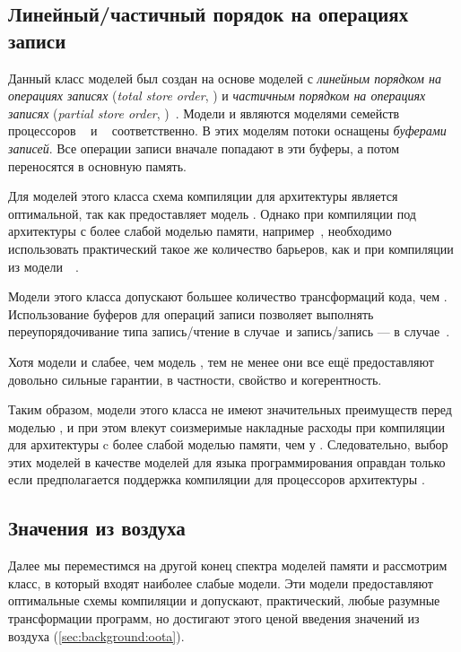 \subsection{Линейный/частичный порядок на операциях записи}
\label{sec:analysis:tso}

Данный  класс моделей был создан на основе моделей с 
\emph{линейным порядком на операциях записях} (\emph{total store order}, \TSO)
и \emph{частичным порядком на операциях записях} (\emph{partial store order}, \PSO)~\cite{Sparc:94}.
Модели \TSO и \PSO являются моделями семейств процессоров \Intel~\cite{Sewell-al:CACM10} 
и \SPARC~\cite{Sparc:94} соответственно. 
В этих моделям потоки оснащены \emph{буферами записей}.
Все операции записи вначале попадают в эти буферы, а потом переносятся в основную память. 

Для моделей этого класса схема компиляции для архитектуры \Intel 
является оптимальной, так как \Intel предоставляет модель \TSO.  
Однако при компиляции под архитектуры с более слабой моделью памяти, 
например~\POWER, необходимо использовать практический такое же 
количество барьеров, как и при компиляции из модели~\SC~\cite{Lustig-al:AISCA15}.

Модели этого класса допускают большее количество трансформаций кода, чем \SC.
Использование буферов для операций записи позволяет выполнять переупорядочивание 
типа запись/чтение в случае~\TSO и  запись/запись --- в случае~\PSO.

Хотя модели \TSO и \PSO слабее, чем модель \SC, 
тем не менее они все ещё предоставляют довольно сильные гарантии, 
в частности, свойство \DRF и когерентность.    

Таким образом, модели этого класса не имеют 
значительных преимуществ перед моделью \SC, 
и при этом влекут соизмеримые накладные расходы 
при компиляции для архитектуры c более слабой моделью памяти, чем у \Intel. 
Следовательно, выбор этих моделей в качестве моделей для 
языка программирования оправдан только если предполагается 
поддержка компиляции для процессоров архитектуры \Intel. 

\subsection{Значения из воздуха}
\label{sec:analysis:oota}

Далее мы переместимся на другой конец спектра моделей памяти
и рассмотрим класс, в который входят наиболее слабые модели. 
Эти модели предоставляют оптимальные схемы компиляции и 
допускают, практический, любые разумные трансформации программ, 
но достигают этого ценой введения значений из воздуха 
(\cref{sec:background:oota}).

